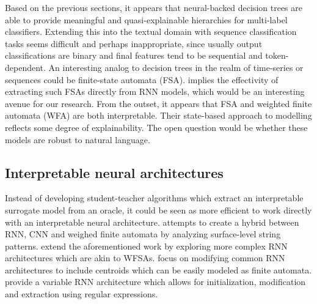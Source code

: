 Based on the previous sections, it appears that neural-backed decision trees are able to provide meaningful and quasi-explainable hierarchies for multi-label classifiers. Extending this into the textual domain with sequence classification tasks seems difficult and perhaps inappropriate, since usually output classifications are binary and final features tend to be sequential and token-dependent. An interesting analog to decision trees in the realm of time-series or sequences could be finite-state automata (FSA). \citet{hou2018learning} implies the effectivity of extracting such FSAs directly from RNN models, which would be an interesting avenue for our research. From the outset, it appears that FSA and weighted finite automata (WFA) are both interpretable. Their state-based approach to modelling reflects some degree of explainability. The open question would be whether these models are robust to natural language.

\subsection{Interpretable neural architectures}

Instead of developing student-teacher algorithms which extract an interpretable surrogate model from an oracle, it could be seen as more efficient to work directly with an interpretable neural architecture. \citet{schwartz2018sopa} attempts to create a hybrid between RNN, CNN and weighed finite automata by analyzing surface-level string patterns. \citet{peng2018rational} extend the aforementioned work by exploring more complex RNN architectures which are akin to WFSAs. \citet{wang2019state} focus on modifying common RNN architectures to include centroids which can be easily modeled as finite automata. \citet{jiangcold} provide a variable RNN architecture which allows for initialization, modification and extraction using regular expressions. 


